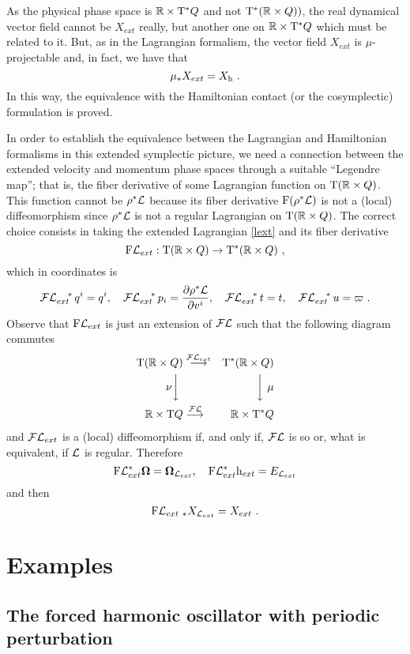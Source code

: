 \documentclass[12pt]{report}
\def\beann{\begin{eqnarray*}}
\def\eeann{\end{eqnarray*}}
\def\derpar#1#2{\frac{\partial{#1}}{\partial{#2}}}
\def\mapping#1{\mathrel{\mathop{\longrightarrow}\limits^{#1}}}
\def\Lag{{\cal L}}
\def\Real{\mathbb{R}}
\def\Tan{{\rm T}}
\def\Leg{{\cal F}\Lag}
\begin{document}
As the physical phase space is $\Real \times \Tan^*Q$ 
and not $\Tan^*(\Real \times Q))$,
the real dynamical vector field  cannot be $X_{ext}$ really, 
but another one on $\Real \times \Tan^*Q$ which must be related to it.
But, as in the Lagrangian formalism, the vector field $X_{ext}$ is $\mu$-projectable
and, in fact, we have that
$$
\mu_* X_{ext} = X_{\rm h} \ .
$$
In this way, the equivalence with the Hamiltonian contact 
(or the cosymplectic) formulation is proved.

In order to establish the equivalence between the Lagrangian and Hamiltonian formalisms
in this extended symplectic picture, we need a connection between the
extended velocity and momentum phase spaces through a suitable ``Legendre map'';
that is, the fiber derivative of some Lagrangian function on $\Tan(\Real \times Q)$.
This function cannot be $\rho^*{\cal L}$ because its fiber derivative
${\rm F}(\rho^*{\cal L})$ is not a (local) diffeomorphism since
$\rho^*{\cal L}$ is not a regular Lagrangian on $\Tan(\Real\times Q)$.
The correct choice consists in taking the extended Lagrangian \eqref{lext}
and its fiber derivative
$$
{\rm F}{\cal L}_{ext} : \Tan (\Real\times Q ) \to \Tan^*(\Real \times Q) \ ,
$$
which in coordinates is
\beann
\Leg_{ext}^{\quad *}\,q^i = q^i ,\quad
\Leg_{ext}^{\quad *} \,p_i = \derpar{\rho^*{\cal L}}{v^i} ,\quad
\Leg_{ext}^{\quad *} \,t = t ,\quad 
\Leg_{ext}^{\quad *} \,u = \varpi  \ .
\eeann
Observe that ${\rm F}{\cal L}_{ext}$ is just an extension of $\Leg$
such that the following diagram commutes
\beann
\Tan ( \Real\times Q) & \mapping{{\cal F}{\cal L}_{ext}} &
\Tan^*(\Real \times Q)
\\
\nu \biggr \downarrow \  &          & \quad \biggr \downarrow \ \mu
\\
\Real\times\Tan Q        & \mapping{\Leg}      & \Real\times\Tan^*Q 
\eeann
and ${\cal F}{\cal L}_{ext}$ is a (local) diffeomorphism if, and only if, $\Leg$ is so
or, what is equivalent, if ${\cal L}$ is regular.
Therefore
$$
{\rm F}{\cal L}_{ext}^*{\mathbf \Omega} = {\mathbf \Omega}_{{\cal L}_{ext}}
,\quad
{\rm F}{\cal L}_{ext}^*{\rm h}_{ext} = E_{{\cal L}_{ext}}
$$
and then
$$
{\rm F}{\cal L}_{{ext}\ *}X_{{\cal L}_{ext}} = X_{ext}  \ .
$$


\section{Examples}


\subsection{The forced harmonic oscillator with periodic perturbation}
\end{document}
